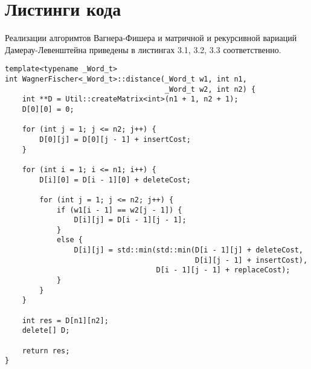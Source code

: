 \section{Листинги кода}
Реализации алгоримтов Вагнера-Фишера и матричной и рекурсивной вариаций Дамерау-Левенштейна приведены в листингах 3.1, 3.2, 3.3 соответственно.

\noindent\begin{minipage}{\textwidth}
\begin{lstlisting}[caption=Расстояние Левенштейна (матричная реализация)]
template<typename _Word_t>
int WagnerFischer<_Word_t>::distance(_Word_t w1, int n1,
                                     _Word_t w2, int n2) {
    int **D = Util::createMatrix<int>(n1 + 1, n2 + 1);
    D[0][0] = 0;

    for (int j = 1; j <= n2; j++) {
        D[0][j] = D[0][j - 1] + insertCost;
    }

    for (int i = 1; i <= n1; i++) {
        D[i][0] = D[i - 1][0] + deleteCost;

        for (int j = 1; j <= n2; j++) {
            if (w1[i - 1] == w2[j - 1]) {
                D[i][j] = D[i - 1][j - 1];
            }
            else {
                D[i][j] = std::min(std::min(D[i - 1][j] + deleteCost,
                                            D[i][j - 1] + insertCost),
                                   D[i - 1][j - 1] + replaceCost);
            }
        }
    }

    int res = D[n1][n2];
    delete[] D;

    return res;
}
\end{lstlisting}
\end{minipage}

